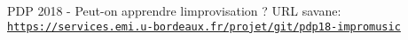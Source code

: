 P\+DP 2018 -\/ Peut-\/on apprendre l\textquotesingle{}improvisation ? U\+RL savane\+: \href{https://services.emi.u-bordeaux.fr/projet/git/pdp18-impromusic}{\tt https\+://services.\+emi.\+u-\/bordeaux.\+fr/projet/git/pdp18-\/impromusic} 